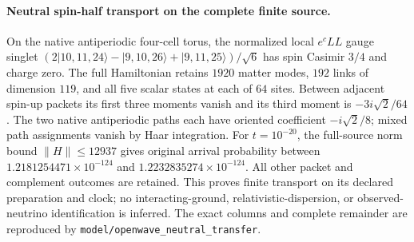 \paragraph{Neutral spin-half transport on the complete finite source.}
On the native antiperiodic four-cell torus, the normalized local
$e^cLL$ gauge singlet $(2|10,11,24\rangle-|9,10,26\rangle+
|9,11,25\rangle)/\sqrt6$ has spin Casimir $3/4$ and charge zero.
The full Hamiltonian retains $1920$ matter modes, $192$ links of dimension
$119$, and all five scalar states at each of $64$ sites. Between adjacent
spin-up packets its first three moments vanish and its third moment is
$-3i\sqrt2/64$. The two native antiperiodic paths each have oriented
coefficient $-i\sqrt2/8$; mixed path assignments vanish by Haar integration.
For $t=10^{-20}$, the full-source norm bound $\|H\|\le12937$ gives original
arrival probability between $1.2181254471\times10^{-124}$ and
$1.2232835274\times10^{-124}$. All other packet and complement outcomes are
retained. This proves finite transport on its declared preparation and
clock; no interacting-ground, relativistic-dispersion, or observed-neutrino
identification is inferred. The exact columns and complete remainder are
reproduced by \texttt{model/openwave\_neutral\_transfer}.

